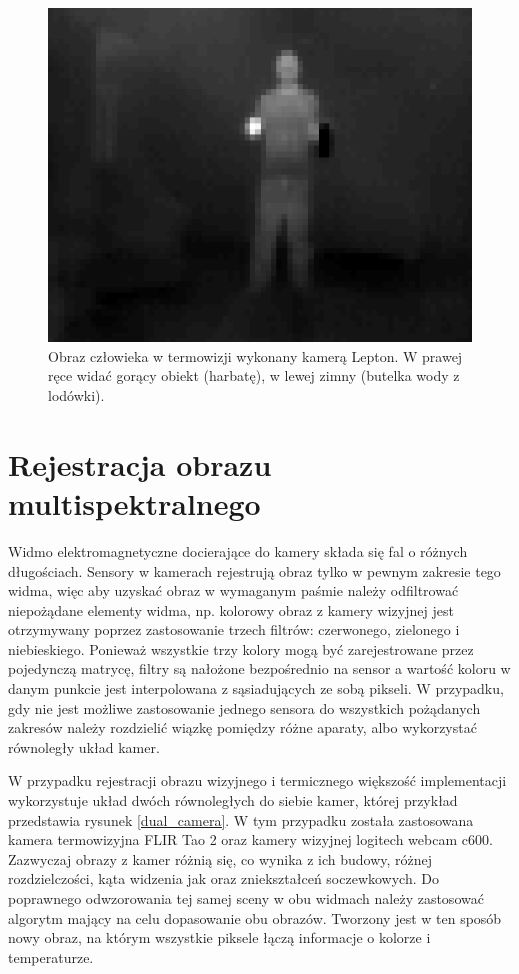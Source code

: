 

\begin{figure}
\centering
\includegraphics[width=0.5\linewidth]{images/leptonTermalImage.png}
\caption[Obraz człowieka w termowizji wykonany kamerą Lepton.]{Obraz człowieka w termowizji wykonany kamerą Lepton. W prawej ręce widać gorący obiekt (harbatę), w lewej zimny (butelka wody z lodówki).}
\label{fig:leptonTermalImage}
\end{figure}



\section{Rejestracja obrazu multispektralnego}

Widmo elektromagnetyczne docierające do kamery składa się fal o różnych długościach. Sensory w kamerach rejestrują obraz tylko w pewnym zakresie tego widma, więc aby uzyskać obraz w wymaganym paśmie należy odfiltrować niepożądane elementy widma, np. kolorowy obraz z kamery wizyjnej jest otrzymywany poprzez zastosowanie trzech filtrów: czerwonego, zielonego i niebieskiego. Ponieważ wszystkie trzy kolory mogą być zarejestrowane przez pojedynczą matrycę, filtry są nałożone bezpośrednio na sensor a wartość koloru w danym punkcie jest interpolowana z sąsiadujących ze sobą pikseli. W przypadku, gdy nie jest możliwe zastosowanie jednego sensora do wszystkich pożądanych zakresów należy rozdzielić wiązkę pomiędzy różne aparaty, albo wykorzystać równoległy układ kamer.

W przypadku rejestracji obrazu wizyjnego i termicznego większość implementacji wykorzystuje układ dwóch równoległych do siebie kamer, której przykład przedstawia rysunek \ref{dual_camera}. W tym przypadku została zastosowana kamera termowizyjna FLIR Tao 2 oraz kamery wizyjnej logitech webcam c600. %
Zazwyczaj obrazy z kamer różnią się, co wynika z ich budowy, różnej rozdzielczości, kąta widzenia jak oraz zniekształceń soczewkowych.
Do poprawnego odwzorowania tej samej sceny w obu widmach należy zastosować algorytm mający na celu dopasowanie obu obrazów. Tworzony jest w ten sposób nowy obraz, na którym wszystkie piksele łączą informacje o kolorze i temperaturze.

